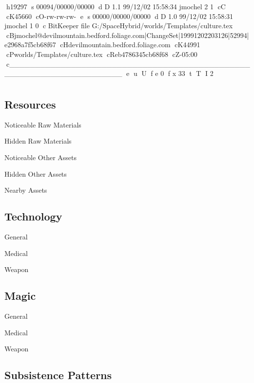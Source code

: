 h19297
s 00094/00000/00000
d D 1.1 99/12/02 15:58:34 jmochel 2 1
cC
cK45660
cO-rw-rw-rw-
e
s 00000/00000/00000
d D 1.0 99/12/02 15:58:31 jmochel 1 0
c BitKeeper file G:/SpaceHybrid/worlds/Templates/culture.tex
cBjmochel@devilmountain.bedford.foliage.com|ChangeSet|19991202203126|52994|e2968a7f5cb68f67
cHdevilmountain.bedford.foliage.com
cK44991
cPworlds/Templates/culture.tex
cReb4786345cb68f68
cZ-05:00
c______________________________________________________________________
e
u
U
f e 0
f x 33
t
T
I 2
\chapter{}

\section{Resources}

\begin{relate}
	\item[Noticeable Raw Materials]
	\item[Hidden Raw Materials]
	\item[Noticeable Other Assets]
	\item[Hidden Other Assets]
	\item[Nearby Assets]
\end{relate}

\section{Technology}
\begin{relate}
	\item[General]
	\item[Medical]
	\item[Weapon]
\end{relate}

\section{Magic}
\begin{relate}
	\item[General]
	\item[Medical]
	\item[Weapon]
\end{relate}

\section{Subsistence Patterns}

